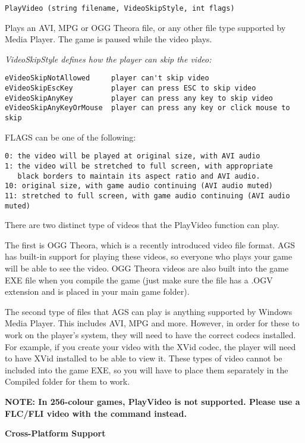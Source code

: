 \begin{verbatim}
PlayVideo (string filename, VideoSkipStyle, int flags)
\end{verbatim}
Plays an AVI, MPG or OGG Theora file, or any other file type supported by Media Player.
The game is paused while the video plays.

\it{VideoSkipStyle} defines how the player can skip the video:
\begin{verbatim}
eVideoSkipNotAllowed     player can't skip video
eVideoSkipEscKey         player can press ESC to skip video
eVideoSkipAnyKey         player can press any key to skip video
eVideoSkipAnyKeyOrMouse  player can press any key or click mouse to skip
\end{verbatim}

FLAGS can be one of the following:
\begin{verbatim}
0: the video will be played at original size, with AVI audio
1: the video will be stretched to full screen, with appropriate
   black borders to maintain its aspect ratio and AVI audio.
10: original size, with game audio continuing (AVI audio muted)
11: stretched to full screen, with game audio continuing (AVI audio muted)
\end{verbatim}

There are two distinct type of videos that the PlayVideo function can play.

The first is OGG Theora, which is a recently introduced video file format. AGS
has built-in support for playing these videos, so everyone who plays your game
will be able to see the video. OGG Theora videos are also built into the game EXE
file when you compile the game (just make sure the file has a .OGV extension and
is placed in your main game folder).

The second type of files that AGS can play is anything supported by Windows Media
Player. This includes AVI, MPG and more. However, in order for these to work on
the player's system, they will need to have the correct codecs installed. For example,
if you create your video with the XVid codec, the player will need to have XVid installed
to be able to view it. These types of video cannot be included into the game EXE,
so you will have to place them separately in the Compiled folder for them to work.

\bf{NOTE:} In 256-colour games, PlayVideo is not supported. Please use a FLC/FLI video
with the  command instead.

\bf{Cross-Platform Support}

